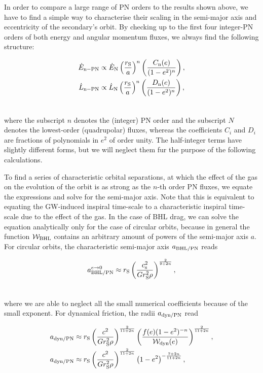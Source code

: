 \documentclass[usenatbib]{mnras}
\begin{document}
In order to compare a large range of PN orders to the results shown above, we have to find a simple way to characterise their scaling in the semi-major axis and eccentricity of the secondary's orbit. By checking up to the first four integer-PN orders of both energy and angular momentum fluxes, we always find the following structure:

\begin{align}
\dot{E}_{\rm{n-PN}} &\propto \dot{E}_{\rm{N}} \left( \frac{r_{\rm S}}{a}\right)^n \left( \frac{C_{\rm{n}}(e)}{(1-e^2)^n}\right), \\
\dot{L}_{\rm{n-PN}} &\propto \dot{L}_{\rm{N}} \left( \frac{r_{\rm S}}{a}\right)^n \left( \frac{D_{\rm{n}}(e)}{(1-e^2)^n}\right),\\ \nonumber
\end{align}

\noindent where the subscript $n$ denotes the (integer) PN order and the subscript $N$ denotes the lowest-order (quadrupolar) fluxes, whereas the coefficients $C_{i}$ and $D_{i}$ are fractions of polynomials in $e^2$ of order unity. The half-integer terms have slightly different forms, but we will neglect them fur the purpose of the following calculations.

To find a series of characteristic orbital separations, at which the effect of the gas on the evolution of the orbit is as strong as the $n$-th order PN fluxes, we equate the expressions and solve for the semi-major axis. Note that this is equivalent to equating the GW-induced inspiral time-scale to a characteristic inspiral time-scale due to the effect of the gas. In the case of BHL drag, we can solve the equation analytically only for the case of circular orbits, because in general the function $\mathcal{W}_{\rm{BHL}}$ contains an arbitrary amount of powers of the semi-major axis $a$. For circular orbits, the characteristic semi-major axis $a_{\rm{BHL/PN}}$ reads

\begin{align}
a_{\rm{BHL/PN}} ^{e\to 0}& \approx r_{\rm S} \left(\frac{c_{\rm s}^2 }{G r_{\rm S}^2 \rho} \right)^{\frac{2}{9+2n}}, \label{eq:r10}\\ \nonumber
\end{align}

\noindent where we are able to neglect all the small numerical coefficients because of the small exponent. For dynamical friction, the radii $a_{\rm{dyn/PN}}$ read

\begin{align}
a_{\rm{dyn/PN}} & \approx r_{\rm S} \left(\frac{c^2 }{G r_{\rm S}^2 \rho} \right)^{\frac{2}{11+2n}}\left( \frac{f(e)(1-e^2)^{-n}}{\mathcal{W}_{\rm{dyn}}(e)} \right)^{\frac{2}{11+2n}},\\
a_{\rm{dyn/PN}} & \approx r_{\rm S} \left(\frac{c^2 }{G r_{\rm S}^2 \rho} \right)^{\frac{2}{11+2n}}\left( 1-e^2\right)^{-\frac{7+2n}{11+2n}},\\ \nonumber
\end{align}
\end{document}
